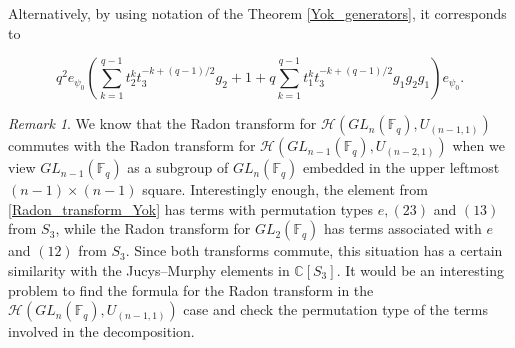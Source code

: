 \documentclass[12pt,reqno]{amsart}
\newtheorem{prop}[thm]{Proposition}
\theoremstyle{definition}
\theoremstyle{remark}
\newtheorem{rem}[thm]{Remark}
\numberwithin{equation}{section}
\newcommand{\CC}{\mathbb{C}}
\newcommand{\GL}[1]{GL_{#1}(\mathbb{F}_q)}
\begin{document}


Alternatively, by using notation of the Theorem \ref{Yok_generators}, it corresponds to

\begin{equation}\label{Radon_transform_Yok}
    q^2e_{\psi_0}\left( \sum_{k=1}^{q-1} t_2^k t_3^{-k+(q-1)/2} g_2 +1+ q\sum_{k=1}^{q-1} t_1^k t_3^{-k+(q-1)/2} g_1 g_2 g_1\right)e_{\psi_0}.
\end{equation}

\begin{rem}
    We know that the Radon transform for $\mathcal{H}(\GL{n},U_{(n-1,1)})$ commutes with the Radon transform for $\mathcal{H}(\GL{n-1},U_{(n-2,1)})$ when we view $\GL{n-1}$ as a subgroup of $\GL{n}$ embedded in the upper leftmost $(n-1)\times (n-1)$ square. Interestingly enough, the element from \eqref{Radon_transform_Yok} has terms with permutation types $e,(23)$ and $(13)$ from $S_3$, while the Radon transform for $\GL{2}$ has terms associated with $e$ and $(12)$ from $S_3$. Since both transforms commute, this situation has a certain similarity with the Jucys–Murphy elements in $\CC[S_3]$. It would be an interesting problem to find the formula for the Radon transform in the $\mathcal{H}(\GL{n},U_{(n-1,1)})$ case and check the permutation type of the terms involved in the decomposition.
\end{rem}



\end{document}
